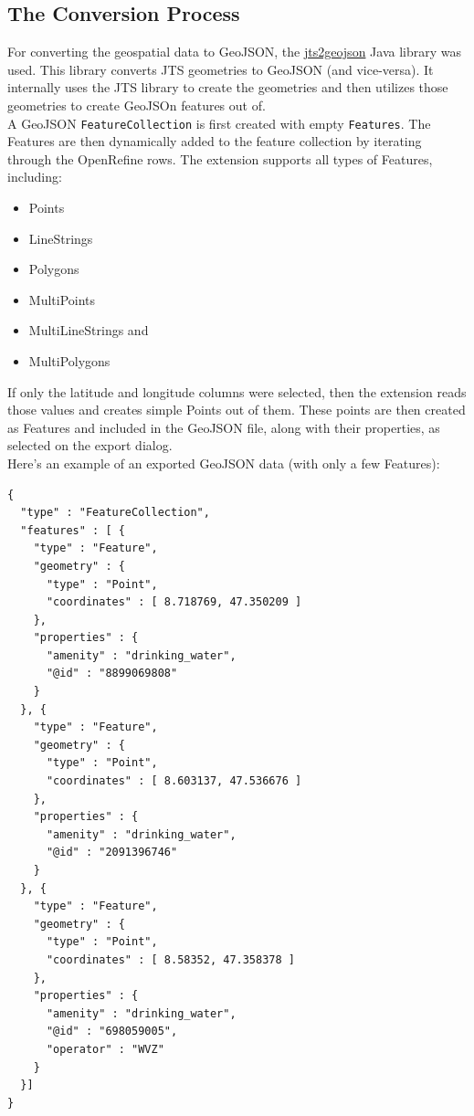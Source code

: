 \subsection{The Conversion Process}
For converting the geospatial data to GeoJSON, the \href{https://github.com/bjornharrtell/jts2geojson}{jts2geojson} Java library was used. This library converts
JTS geometries to GeoJSON (and vice-versa). It internally uses the JTS library to create the geometries and then utilizes those geometries to create GeoJSOn
features out of.\\
\newline
A GeoJSON \texttt{FeatureCollection} is first created with empty \texttt{Features}. The Features are then dynamically added to the feature collection by
iterating through the OpenRefine rows. The extension supports all types of Features, including:
\begin{itemize}
    \item Points
    \item LineStrings
    \item Polygons
    \item MultiPoints
    \item MultiLineStrings and
    \item MultiPolygons
\end{itemize}
If only the latitude and longitude columns were selected, then the extension reads those values and creates simple Points out of them. These points are then created as Features
and included in the GeoJSON file, along with their properties, as selected on the export dialog.\\
\newline
Here's an example of an exported GeoJSON data (with only a few Features):
\begin{verbatim}
{
  "type" : "FeatureCollection",
  "features" : [ {
    "type" : "Feature",
    "geometry" : {
      "type" : "Point",
      "coordinates" : [ 8.718769, 47.350209 ]
    },
    "properties" : {
      "amenity" : "drinking_water",
      "@id" : "8899069808"
    }
  }, {
    "type" : "Feature",
    "geometry" : {
      "type" : "Point",
      "coordinates" : [ 8.603137, 47.536676 ]
    },
    "properties" : {
      "amenity" : "drinking_water",
      "@id" : "2091396746"
    }
  }, {
    "type" : "Feature",
    "geometry" : {
      "type" : "Point",
      "coordinates" : [ 8.58352, 47.358378 ]
    },
    "properties" : {
      "amenity" : "drinking_water",
      "@id" : "698059005",
      "operator" : "WVZ"
    }
  }]
}
\end{verbatim}
